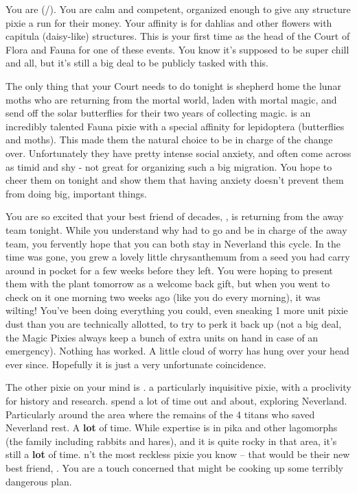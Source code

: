 \documentclass[char]{PP}
\begin{document}
\name{\cFHead{}}

You are \cFHead{} (\cFHead{\They}/\cFHead{\Them}). You are calm and competent, organized enough to give any structure pixie a run for their money. Your affinity is for dahlias and other flowers with capitula (daisy-like) structures. This is your first time as the head of the Court of Flora and Fauna for one of these events. You know it’s supposed to be super chill and all, but it’s still a big deal to be publicly tasked with this.

The only thing that your Court needs to do tonight is shepherd home the lunar moths who are returning from the mortal world, laden with mortal magic, and send off the solar butterflies for their two years of collecting magic. \cFButterfly{} is an incredibly talented Fauna pixie with a special affinity for lepidoptera (butterflies and moths). This made them the natural choice to be in charge of the change over. Unfortunately they have pretty intense social anxiety, and often come across as timid and shy - not great for organizing such a big migration. You hope to cheer them on tonight and show them that having anxiety doesn’t prevent them from doing big, important things.

You are so excited that your best friend of decades, \cSPM{}, is returning from the away team tonight. While you understand why \cSPM{\they} had to go and be in charge of the away team, you fervently hope that you can both stay in Neverland this cycle. In the time \cSPM{} was gone, you grew a lovely little chrysanthemum from a seed you had \cSPM{\them} carry around in \cSPM{\their} pocket for a few weeks before they left. You were hoping to present them with the plant tomorrow as a welcome back gift, but when you went to check on it one morning two weeks ago (like you do every morning), it was wilting! You’ve been doing everything you could, even sneaking 1 more unit pixie dust than you are technically allotted, to try to perk it back up (not a big deal, the Magic Pixies always keep a bunch of extra units on hand in case of an emergency). Nothing has worked. A little cloud of worry has hung over your head ever since. Hopefully it is just a very unfortunate coincidence.

The other pixie on your mind is \cFTitan{}. \cFTitan{\They} \cFTitan{\are} a particularly inquisitive pixie, with a proclivity for history and research. \cFTitan{\They} spend\cFTitan{\plural} a lot of time out and about, exploring Neverland. Particularly around the area where the remains of the 4 titans who saved Neverland rest. A \textbf{lot} of time. While \cFTitan{\their} expertise is in pika and other lagomorphs (the family including rabbits and hares), and it is quite rocky in that area, it’s still a \textbf{lot} of time. \cFTitan{\Theyare}n’t the most reckless pixie you know -- that would be their new best friend, \cEAirship{}. You are a touch concerned that \cFTitan{} might be cooking up some terribly dangerous plan.
\end{document}
